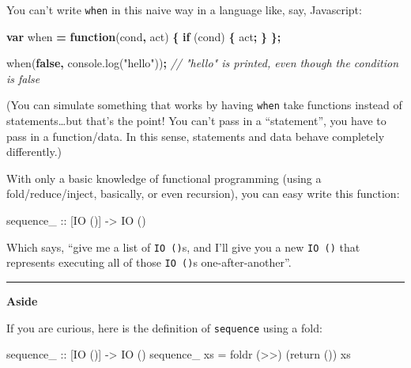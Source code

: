 \documentclass[]{article}
\newenvironment{Shaded}{\begin{snugshade}}{\end{snugshade}}
\newcommand{\AttributeTok}[1]{\textcolor[rgb]{0.77,0.63,0.00}{#1}}
\newcommand{\CommentTok}[1]{\textcolor[rgb]{0.56,0.35,0.01}{\textit{#1}}}
\newcommand{\ControlFlowTok}[1]{\textcolor[rgb]{0.13,0.29,0.53}{\textbf{#1}}}
\newcommand{\DataTypeTok}[1]{\textcolor[rgb]{0.13,0.29,0.53}{#1}}
\newcommand{\FunctionTok}[1]{\textcolor[rgb]{0.00,0.00,0.00}{#1}}
\newcommand{\KeywordTok}[1]{\textcolor[rgb]{0.13,0.29,0.53}{\textbf{#1}}}
\newcommand{\NormalTok}[1]{#1}
\newcommand{\OperatorTok}[1]{\textcolor[rgb]{0.81,0.36,0.00}{\textbf{#1}}}
\newcommand{\OtherTok}[1]{\textcolor[rgb]{0.56,0.35,0.01}{#1}}
\newcommand{\StringTok}[1]{\textcolor[rgb]{0.31,0.60,0.02}{#1}}
\newcommand{\VariableTok}[1]{\textcolor[rgb]{0.00,0.00,0.00}{#1}}
\begin{document}
You can't write \texttt{when} in this naive way in a language like, say,
Javascript:

\begin{Shaded}
\begin{Highlighting}[]
\KeywordTok{var}\NormalTok{ when }\OperatorTok{=} \KeywordTok{function}\NormalTok{(cond}\OperatorTok{,}\NormalTok{ act) }\OperatorTok{\{} \ControlFlowTok{if}\NormalTok{ (cond) }\OperatorTok{\{}\NormalTok{ act}\OperatorTok{;} \OperatorTok{\}} \OperatorTok{\};}

\AttributeTok{when}\NormalTok{(}\KeywordTok{false}\OperatorTok{,} \VariableTok{console}\NormalTok{.}\AttributeTok{log}\NormalTok{(}\StringTok{"hello"}\NormalTok{))}\OperatorTok{;}
\CommentTok{// "hello" is printed, even though the condition is false}
\end{Highlighting}
\end{Shaded}

(You can simulate something that works by having \texttt{when} take functions
instead of statements\ldots{}but that's the point! You can't pass in a
``statement'', you have to pass in a function/data. In this sense, statements
and data behave completely differently.)

With only a basic knowledge of functional programming (using a
fold/reduce/inject, basically, or even recursion), you can easy write this
function:

\begin{Shaded}
\begin{Highlighting}[]
\NormalTok{sequence_}\OtherTok{ ::}\NormalTok{ [}\DataTypeTok{IO}\NormalTok{ ()] }\OtherTok{->} \DataTypeTok{IO}\NormalTok{ ()}
\end{Highlighting}
\end{Shaded}

Which says, ``give me a list of \texttt{IO\ ()}s, and I'll give you a new
\texttt{IO\ ()} that represents executing all of those \texttt{IO\ ()}s
one-after-another''.

\begin{center}\rule{0.5\linewidth}{\linethickness}\end{center}

\textbf{Aside}

If you are curious, here is the definition of \texttt{sequence} using a fold:

\begin{Shaded}
\begin{Highlighting}[]
\NormalTok{sequence_}\OtherTok{ ::}\NormalTok{ [}\DataTypeTok{IO}\NormalTok{ ()] }\OtherTok{->} \DataTypeTok{IO}\NormalTok{ ()}
\NormalTok{sequence_ xs }\FunctionTok{=}\NormalTok{ foldr (}\FunctionTok{>>}\NormalTok{) (return ()) xs}
\end{Highlighting}
\end{Shaded}
\end{document}
